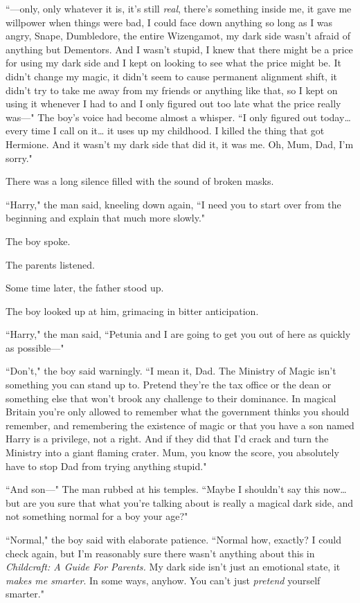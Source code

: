 ``—only, only whatever it is, it's still \emph{real}, there's something inside me, it gave me willpower when things were bad, I could face down anything so long as I was angry, Snape, Dumbledore, the entire Wizengamot, my dark side wasn't afraid of anything but Dementors. And I wasn't stupid, I knew that there might be a price for using my dark side and I kept on looking to see what the price might be. It didn't change my magic, it didn't seem to cause permanent alignment shift, it didn't try to take me away from my friends or anything like that, so I kept on using it whenever I had to and I only figured out too late what the price really was—" The boy's voice had become almost a whisper. ``I only figured out today{\ldots} every time I call on it{\ldots} it uses up my childhood. I killed the thing that got Hermione. And it wasn't my dark side that did it, it was me. Oh, Mum, Dad, I'm sorry."

There was a long silence filled with the sound of broken masks.

``Harry," the man said, kneeling down again, ``I need you to start over from the beginning and explain that much more slowly."

The boy spoke.

The parents listened.

Some time later, the father stood up.

The boy looked up at him, grimacing in bitter anticipation.

``Harry," the man said, ``Petunia and I are going to get you out of here as quickly as possible—"

``Don't," the boy said warningly. ``I mean it, Dad. The Ministry of Magic isn't something you can stand up to. Pretend they're the tax office or the dean or something else that won't brook any challenge to their dominance. In magical Britain you're only allowed to remember what the government thinks you should remember, and remembering the existence of magic or that you have a son named Harry is a privilege, not a right. And if they did that I'd crack and turn the Ministry into a giant flaming crater. Mum, you know the score, you absolutely have to stop Dad from trying anything stupid."

``And son—" The man rubbed at his temples. ``Maybe I shouldn't say this now{\ldots} but are you sure that what you're talking about is really a magical dark side, and not something normal for a boy your age?"

``Normal," the boy said with elaborate patience. ``Normal how, exactly? I could check again, but I'm reasonably sure there wasn't anything about this in \emph{Childcraft: A Guide For Parents.} My dark side isn't just an emotional state, it \emph{makes me smarter}. In some ways, anyhow. You can't just \emph{pretend} yourself smarter."

